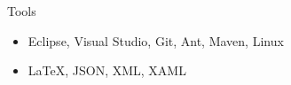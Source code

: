 \cvitem
    {Tools}
    {\begin{itemize}
        \item Eclipse, Visual Studio, Git, Ant, Maven, Linux
        \item \LaTeX, JSON, XML, XAML
    \end{itemize}}
    \vspace*{-\baselineskip}